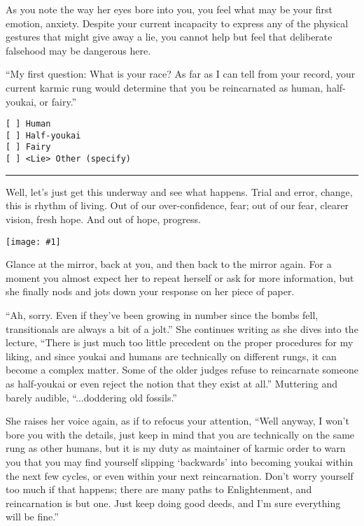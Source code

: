 \documentclass[a4paper,12pt]{book}
\newenvironment{commentary}%
	{
		\vfill%
		\hrule%
		\begin{footnotesize}%
		\color{MidnightBlue}%
	}%
	{%
		\end{footnotesize}%
	}
\newcommand{\img}[1]{%
	\texttt{[image: \#1]}%
}
\begin{document}
As you note the way her eyes bore into you, you feel what may be your first emotion, anxiety. Despite your current incapacity to express any of the physical gestures that might give away a lie, you cannot help but feel that deliberate falsehood may be dangerous here.

``My first question: What is your race? As far as I can tell from your record, your current karmic rung would determine that you be reincarnated as human, half-youkai, or fairy.''

\begin{verbatim}
[ ] Human
[ ] Half-youkai
[ ] Fairy
[ ] <Lie> Other (specify)
\end{verbatim}

\begin{commentary}
Well, let's just get this underway and see what happens. Trial and error, change, this is rhythm of living. Out of our over-confidence, fear; out of our fear, clearer vision, fresh hope. And out of hope, progress.
\end{commentary}



\newpage

\img{siki-two}

Glance at the mirror, back at you, and then back to the mirror again. For a moment you almost expect her to repeat herself or ask for more information, but she finally nods and jots down your response on her piece of paper.

``Ah, sorry. Even if they've been growing in number since the bombs fell, transitionals are always a bit of a jolt.'' She continues writing as she dives into the lecture, ``There is just much too little precedent on the proper procedures for my liking, and since youkai and humans are technically on different rungs, it can become a complex matter. Some of the older judges refuse to reincarnate someone as half-youkai or even reject the notion that they exist at all.'' Muttering and barely audible, ``...doddering old fossils.''

She raises her voice again, as if to refocus your attention, ``Well anyway, I won't bore you with the details, just keep in mind that you are technically on the same rung as other humans, but it is my duty as maintainer of karmic order to warn you that you may find yourself slipping `backwards' into becoming youkai within the next few cycles, or even within your next reincarnation. Don't worry yourself too much if that happens; there are many paths to Enlightenment, and reincarnation is but one. Just keep doing good deeds, and I'm sure everything will be fine.''
\end{document}
